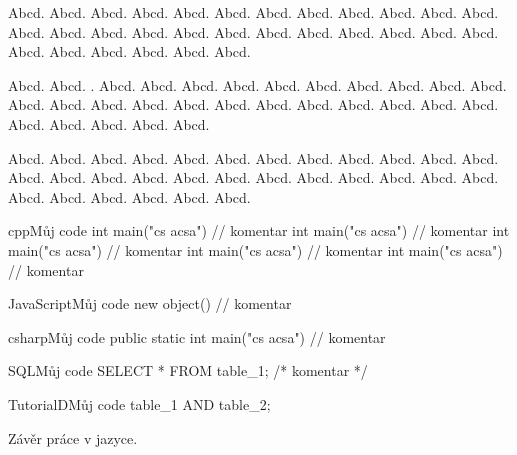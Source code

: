 \documentclass[12pt]{article}
\begin{document}
\begin{lemma}
Abcd. Abcd. Abcd. Abcd. Abcd. Abcd. Abcd. Abcd. Abcd. Abcd. Abcd. Abcd. Abcd. Abcd. Abcd. Abcd. Abcd. Abcd. Abcd. Abcd. Abcd. Abcd. Abcd. Abcd. Abcd. Abcd. Abcd. Abcd. Abcd. Abcd. 
\end{lemma}

\begin{consequence}
Abcd. Abcd. . Abcd. Abcd. Abcd. Abcd. Abcd. Abcd. Abcd. Abcd. Abcd. Abcd. Abcd. Abcd. Abcd. Abcd. Abcd. Abcd. Abcd. Abcd. Abcd. Abcd. Abcd. Abcd. Abcd. Abcd. Abcd. Abcd. Abcd. 
\end{consequence}

\begin{theorem}
Abcd. Abcd. Abcd. Abcd. Abcd. Abcd. Abcd. Abcd. Abcd. Abcd. Abcd. Abcd. Abcd. Abcd. Abcd. Abcd. Abcd. Abcd. Abcd. Abcd. Abcd. Abcd. Abcd. Abcd. Abcd. Abcd. Abcd. Abcd. Abcd. Abcd. 
\end{theorem}


\begin{upcode}{cpp}{}{Můj code}
int main("cs acsa") // komentar
int main("cs acsa") // komentar
int main("cs acsa") // komentar
int main("cs acsa") // komentar
int main("cs acsa") // komentar
\end{upcode}

\begin{upcode}{JavaScript}{}{Můj code}
new object() // komentar
\end{upcode}

\begin{upcode}{csharp}{}{Můj code}
public static int main("cs acsa") // komentar
\end{upcode}

\begin{upcode}{SQL}{}{Můj code}
SELECT * FROM table_1; /* komentar */
\end{upcode}

\begin{upcode}{TutorialD}{}{Můj code}
table_1 AND table_2;
\end{upcode}

\upendofmainmatter

\begin{upconclusions}[czech]
Závěr práce v  jazyce.
\end{upconclusions}
\end{document}
